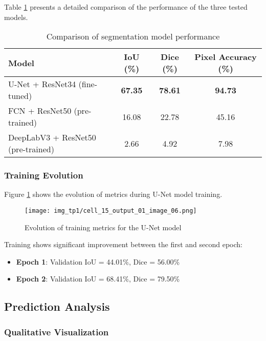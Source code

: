 \documentclass[12pt,a4paper]{article}
\begin{document}
Table \ref{tab:model_comparison} presents a detailed comparison of the performance of the three tested models.

\begin{table}[H]
\centering
\caption{Comparison of segmentation model performance}
\label{tab:model_comparison}
\begin{tabular}{@{}lccc@{}}
\toprule
\textbf{Model} & \textbf{IoU (\%)} & \textbf{Dice (\%)} & \textbf{Pixel Accuracy (\%)} \\
\midrule
U-Net + ResNet34 (fine-tuned) & \textbf{67.35} & \textbf{78.61} & \textbf{94.73} \\
FCN + ResNet50 (pre-trained) & 16.08 & 22.78 & 45.16 \\
DeepLabV3 + ResNet50 (pre-trained) & 2.66 & 4.92 & 7.98 \\
\bottomrule
\end{tabular}
\end{table}

\subsubsection{Training Evolution}

Figure \ref{fig:training_curves} shows the evolution of metrics during U-Net model training.

\begin{figure}[H]
    \centering
    \texttt{[image: img\_tp1/cell\_15\_output\_01\_image\_06.png]}
    \caption{Evolution of training metrics for the U-Net model}
    \label{fig:training_curves}
\end{figure}

Training shows significant improvement between the first and second epoch:
\begin{itemize}
    \item \textbf{Epoch 1}: Validation IoU = 44.01\%, Dice = 56.00\%
    \item \textbf{Epoch 2}: Validation IoU = 68.41\%, Dice = 79.50\%
\end{itemize}

\subsection{Prediction Analysis}

\subsubsection{Qualitative Visualization}
\end{document}
